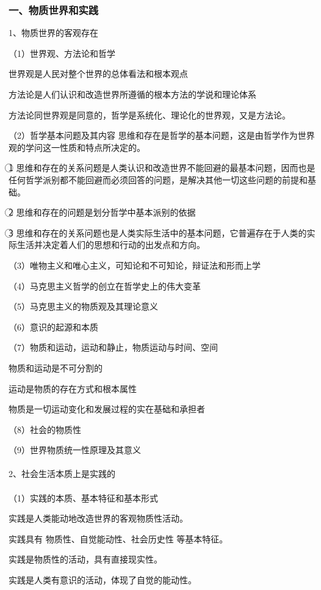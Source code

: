 \documentclass{ctexart}
\begin{document}
\subsubsection{一、物质世界和实践}
1、物质世界的客观存在

（1）世界观、方法论和哲学

世界观是人民对整个世界的总体看法和根本观点

方法论是人们认识和改造世界所遵循的根本方法的学说和理论体系

方法论同世界观是同意的，哲学是系统化、理论化的世界观，又是方法论。

（2）哲学基本问题及其内容
思维和存在是哲学的基本问题，这是由哲学作为世界观的学问这一性质和特点所决定的。

\textcircled{1} 思维和存在的关系问题是人类认识和改造世界不能回避的最基本问题，因而也是任何哲学派别都不能回避而必须回答的问题，是解决其他一切这些问题的前提和基础。

\textcircled{2} 思维和存在的问题是划分哲学中基本派别的依据

\textcircled{3} 思维和存在的关系问题也是人类实际生活中的基本问题，它普遍存在于人类的实际生活并决定着人们的思想和行动的出发点和方向。

（3）唯物主义和唯心主义，可知论和不可知论，辩证法和形而上学

（4）马克思主义哲学的创立在哲学史上的伟大变革

（5）马克思主义的物质观及其理论意义

（6）意识的起源和本质

（7）物质和运动，运动和静止，物质运动与时间、空间

物质和运动是不可分割的

运动是物质的存在方式和根本属性

物质是一切运动变化和发展过程的实在基础和承担者

（8）社会的物质性

（9）世界物质统一性原理及其意义
\\\\

2、社会生活本质上是实践的
\\\\
（1）实践的本质、基本特征和基本形式

实践是人类能动地改造世界的客观物质性活动。

实践具有 物质性、自觉能动性、社会历史性 等基本特征。

实践是物质性的活动，具有直接现实性。

实践是人类有意识的活动，体现了自觉的能动性。
\end{document}
